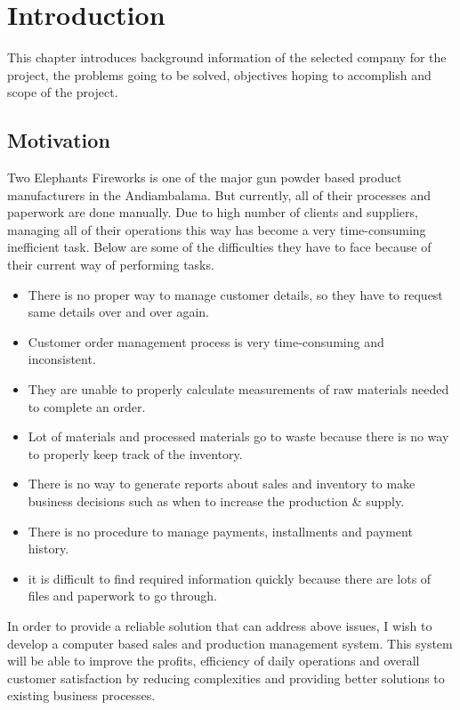 \documentclass[12pt]{report}
\begin{document}
\chapter{Introduction}
This chapter introduces background information of the selected company for the project, the problems going to be solved, objectives hoping to accomplish and scope of the project.

\section{Motivation}
Two Elephants Fireworks is one of the major gun powder based product manufacturers in  the Andiambalama. But currently, all of their processes and paperwork are done manually. Due to high number of clients and suppliers, managing all of their operations this way has become a very time-consuming inefficient task. Below are some of the difficulties they have to face because of their current way of performing tasks.

\begin{itemize}
	\item There is no proper way to manage customer details, so they have to request same details over and over again.
	\item Customer order management process is very time-consuming and inconsistent.
	\item They are unable to properly calculate measurements of raw materials needed to complete an order.
	\item Lot of materials and processed materials go to waste because there is no way to properly keep track of the inventory.
	\item There is no way to generate reports about sales and inventory to make business decisions such as when to increase the production \& supply.
	\item There is no procedure to manage payments, installments and payment history.
	\item it is difficult to find required information quickly because there are lots of files and paperwork to go through.
\end{itemize}

In order to provide a reliable solution that can address above issues, I wish to develop a computer based sales and production management system. This system will be able to improve the profits, efficiency of daily operations and overall customer satisfaction by reducing complexities and providing better solutions to existing business processes.
\end{document}
